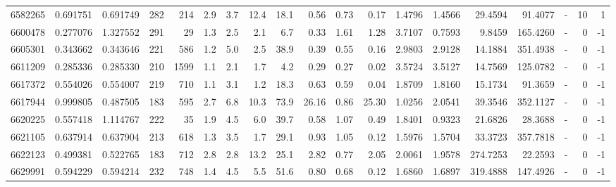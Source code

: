 \begin{tabular}{rrrrrrrrrrrrrrrrlrr}
   6582265 & 0.691751 &   0.691749 &  282 &  214 &      2.9 &      3.7 &    12.4 &     18.1 &       0.56 &        0.73 &        0.17 &  1.4796 &  1.4566 &   29.4594 &   91.4077 &             - &       10 &          1 \\
   6600478 & 0.277076 &   1.327552 &  291 &   29 &      1.3 &      2.5 &     2.1 &      6.7 &       0.33 &        1.61 &        1.28 &  3.7107 &  0.7593 &    9.8459 &  165.4260 &             - &        0 &         -1 \\
   6605301 & 0.343662 &   0.343646 &  221 &  586 &      1.2 &      5.0 &     2.5 &     38.9 &       0.39 &        0.55 &        0.16 &  2.9803 &  2.9128 &   14.1884 &  351.4938 &             - &        0 &         -1 \\
   6611209 & 0.285336 &   0.285330 &  210 & 1599 &      1.1 &      2.1 &     1.7 &      4.2 &       0.29 &        0.27 &        0.02 &  3.5724 &  3.5127 &   14.7569 &  125.0782 &             - &        0 &         -1 \\
   6617372 & 0.554026 &   0.554007 &  219 &  710 &      1.1 &      3.1 &     1.2 &     18.3 &       0.63 &        0.59 &        0.04 &  1.8709 &  1.8160 &   15.1734 &   91.3659 &             - &        0 &         -1 \\
   6617944 & 0.999805 &   0.487505 &  183 &  595 &      2.7 &      6.8 &    10.3 &     73.9 &      26.16 &        0.86 &       25.30 &  1.0256 &  2.0541 &   39.3546 &  352.1127 &             - &        0 &         -1 \\
   6620225 & 0.557418 &   1.114767 &  222 &   35 &      1.9 &      4.5 &     6.0 &     39.7 &       0.58 &        1.07 &        0.49 &  1.8401 &  0.9323 &   21.6826 &   28.3688 &             - &        0 &         -1 \\
   6621105 & 0.637914 &   0.637904 &  213 &  618 &      1.3 &      3.5 &     1.7 &     29.1 &       0.93 &        1.05 &        0.12 &  1.5976 &  1.5704 &   33.3723 &  357.7818 &             - &        0 &         -1 \\
   6622123 & 0.499381 &   0.522765 &  183 &  712 &      2.8 &      2.8 &    13.2 &     25.1 &       2.82 &        0.77 &        2.05 &  2.0061 &  1.9578 &  274.7253 &   22.2593 &             - &        0 &         -1 \\
   6629991 & 0.594229 &   0.594214 &  232 &  748 &      1.4 &      4.5 &     5.5 &     51.6 &       0.80 &        0.68 &        0.12 &  1.6860 &  1.6897 &  319.4888 &  147.4926 &             - &        0 &         -1 \\

\end{tabular}
